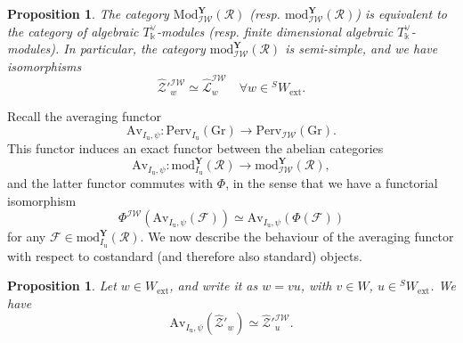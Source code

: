 \documentclass[11pt]{amsart}
\theoremstyle{plain}
\newtheorem{prop}[thm]{Proposition}
\theoremstyle{remark}
\numberwithin{equation}{section}
\begin{document}
\begin{prop}{{\cite[Proposition 5.7]{achar2022geometric}}}\label{prop semi-simple IW}
    The category $\mathrm{Mod}^\mathbf{Y}_{\mathcal{IW}}(\mathcal{R})$ (resp. $\mathrm{mod}^\mathbf{Y}_{\mathcal{IW}}(\mathcal{R})$) is equivalent to the category of algebraic $T^\vee_\mathbb{k}$-modules (resp. finite dimensional algebraic $T^\vee_\mathbb{k}$-modules). In particular, the category $\mathrm{mod}^\mathbf{Y}_{\mathcal{IW}}(\mathcal{R})$ is semi-simple, and we have isomorphisms
    $$\widehat{\mathcal{Z}}'^{\mathcal{IW}}_w\simeq  \widehat{\mathcal{L}}_w^{\mathcal{IW}}\quad\forall w\in {^SW_{\mathrm{ext}}}.$$
\end{prop}
Recall the averaging functor
$$\mathrm{Av}_{I_\mathrm{u},\psi}:\mathrm{Perv}_{I_\mathrm{u}}(\mathrm{Gr})\to \mathrm{Perv}_{\mathcal{IW}}(\mathrm{Gr}). $$
 This functor induces an exact functor between the abelian categories
$$\mathrm{Av}_{I_\mathrm{u},\psi}:\mathrm{mod}^\mathbf{Y}_{I_\mathrm{u}}(\mathcal{R})\to \mathrm{mod}^\mathbf{Y}_{\mathcal{IW}}(\mathcal{R}), $$
and the latter functor commutes with $\Phi$, in the sense that we have a functorial isomorphism
$$\Phi^\mathcal{IW}(\mathrm{Av}_{I_\mathrm{u},\psi}(\mathcal{F}))\simeq \mathrm{Av}_{I_\mathrm{u},\psi}(\Phi(\mathcal{F})) $$
for any $\mathcal{F}\in\mathrm{mod}^\mathbf{Y}_{I_\mathrm{u}}(\mathcal{R})$. We now describe the behaviour of the averaging functor with respect to costandard (and therefore also standard) objects.
\begin{prop}{{\cite[Lemma 6.3]{achar2022geometric}}}\label{Prop averaging simples}
   Let $w\in W_\mathrm{ext}$, and write it as $w=vu$, with $v\in W$, $u\in {^SW_{\mathrm{ext}}}$. We have
   $$\mathrm{Av}_{I_\mathrm{u},\psi}(\widehat{\mathcal{Z}}'_{w})\simeq\widehat{\mathcal{Z}}'^{\mathcal{IW}}_{u}.$$
\end{prop}
\end{document}
